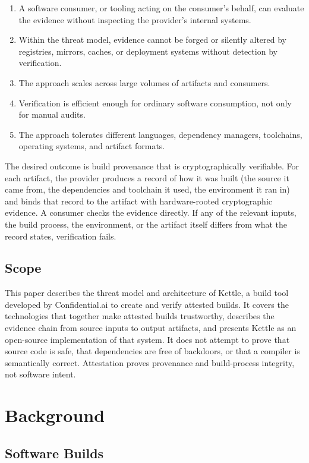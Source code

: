 \documentclass[11pt]{article}
\begin{document}
\begin{enumerate}
\item A software consumer, or tooling acting on the consumer's behalf, can evaluate the evidence without inspecting the provider's internal systems.
\item Within the threat model, evidence cannot be forged or silently altered by registries, mirrors, caches, or deployment systems without detection by verification.
\item The approach scales across large volumes of artifacts and consumers.
\item Verification is efficient enough for ordinary software consumption, not only for manual audits.
\item The approach tolerates different languages, dependency managers, toolchains, operating systems, and artifact formats.
\end{enumerate}

The desired outcome is build provenance that is cryptographically verifiable. For each artifact, the provider produces a record of how it was built (the source it came from, the dependencies and toolchain it used, the environment it ran in) and binds that record to the artifact with hardware-rooted cryptographic evidence. A consumer checks the evidence directly. If any of the relevant inputs, the build process, the environment, or the artifact itself differs from what the record states, verification fails.

\subsection{Scope}

This paper describes the threat model and architecture of Kettle, a build tool developed by Confidential.ai to create and verify attested builds. It covers the technologies that together make attested builds trustworthy, describes the evidence chain from source inputs to output artifacts, and presents Kettle as an open-source implementation of that system. It does not attempt to prove that source code is safe, that dependencies are free of backdoors, or that a compiler is semantically correct. Attestation proves provenance and build-process integrity, not software intent.

\section{Background}

\subsection{Software Builds}
\end{document}
